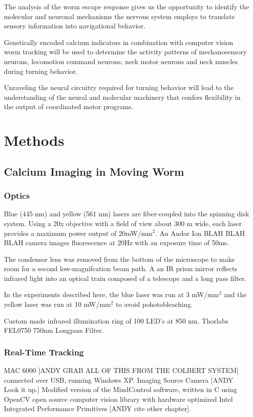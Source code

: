 The analysis of the worm escape response gives us the  opportunity to identify the molecular and neuronal mechanisms  the nervous system employs to translate sensory information into navigational behavior. 

Genetically encoded calcium indicators in combination with  computer vision worm tracking will be used to determine the activity patterns of mechanosensory neurons, locomotion command neurons, neck motor neurons and neck muscles during turning behavior.  

Unraveling the neural circuitry required for turning behavior will lead to the understanding of the neural and molecular machinery that confers flexibility in the output of coordinated motor programs.



\section{Methods}


\subsection{Calcium Imaging in Moving Worm}
\subsubsection{Optics}

Blue (445 nm) and yellow (561 nm) lasers are fiber-coupled into the spinning disk system. Using a 20x objective with a field of view  about 300 \textmu m wide, each laser  provides a maximum power output of 20mW/mm$^2$. An Andor Ion BLAH BLAH BLAH camera images fluorescence at 20Hz with an exposure time of 50ms. 

The condensor lens was removed from the bottom of the microscope to make room for a second low-magnifcation beam path. A an IR prism mirror reflects infrared light into an optical train composed of a telescope and a long pass filter.  

In the experiments described here, the blue laser was run at 3 mW/mm$^2$ and the yellow laser was run at 10 mW/mm$^2$ to avoid pohotobleaching. 

Custom made infrared illumination ring of 100 LED's at 850 nm. 
Thorlabs FEL0750  750nm Longpass Filter.





\subsubsection{Real-Time Tracking}
MAC 6000 [ANDY GRAB ALL OF THIS FROM THE COLBERT SYSTEM] connected over USB, running Windows XP. 
Imaging Source Camera [ANDY Look it up.]
Modified version of the MindControl software, written in C using OpenCV open source computer vision library with hardware optimized Intel Integrated Performance Primitives [ANDY cite other chapter]. 

